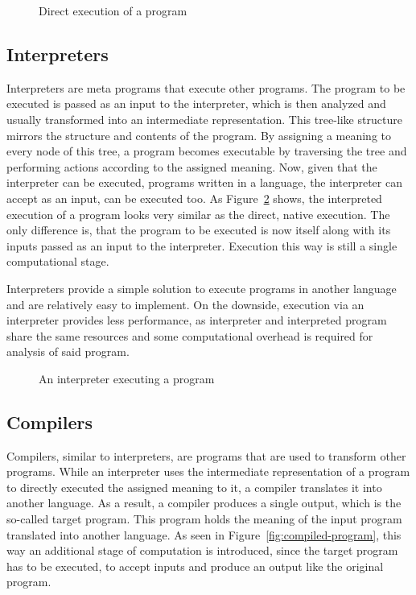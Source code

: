 \begin{figure}
  \centering
  \caption{Direct execution of a program}\label{fig:native-program}
\end{figure}



\subsection{Interpreters}

Interpreters are meta programs that execute other programs.
The program to be executed is passed as an input to the interpreter, which is then analyzed and usually transformed into an intermediate representation.
This tree-like structure mirrors the structure and contents of the program.
By assigning a meaning to every node of this tree, a program becomes executable by traversing the tree and performing actions according to the assigned meaning.
Now, given that the interpreter can be executed, programs written in a language, the interpreter can accept as an input, can be executed too.
As Figure~\ref{fig:interpreted-program} shows, the interpreted execution of a program looks very similar as the direct, native execution.
The only difference is, that the program to be executed is now itself along with its inputs passed as an input to the interpreter.
Execution this way is still a single computational stage.

Interpreters provide a simple solution to execute programs in another language and are relatively easy to implement.
On the downside, execution via an interpreter provides less performance, as interpreter and interpreted program share the same resources and some computational overhead is required for analysis of said program.

\begin{figure}
  \centering
  \caption{An interpreter executing a program}\label{fig:interpreted-program}
\end{figure}


\subsection{Compilers}

Compilers, similar to interpreters, are programs that are used to transform other programs.
While an interpreter uses the intermediate representation of a program to directly executed the assigned meaning to it, a compiler translates it into another language.
As a result, a compiler produces a single output, which is the so-called target program.
This program holds the meaning of the input program translated into another language.
As seen in Figure~\ref{fig:compiled-program}, this way an additional stage of computation is introduced, since the target program has to be executed, to accept inputs and produce an output like the original program.

